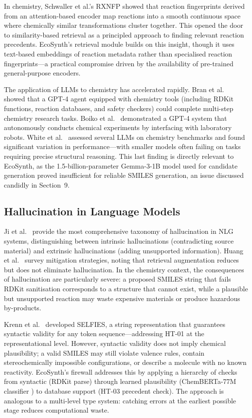 \documentclass[12pt,a4paper]{article}
\begin{document}
In chemistry, Schwaller et al.'s RXNFP \cite{schwaller2021rxnfp} showed that
reaction fingerprints derived from an attention-based encoder map reactions into
a smooth continuous space where chemically similar transformations cluster
together. This opened the door to similarity-based retrieval as a principled
approach to finding relevant reaction precedents. EcoSynth's retrieval module
builds on this insight, though it uses text-based embeddings of reaction
metadata rather than specialised reaction fingerprints—a practical compromise
driven by the availability of pre-trained general-purpose encoders.

The application of LLMs to chemistry has accelerated rapidly. Bran et
al.~\cite{bran2023chemcrow} showed that a GPT-4 agent equipped with chemistry
tools (including RDKit functions, reaction databases, and safety checkers) could
complete multi-step chemistry research tasks. Boiko et al.~\cite{boiko2023autonomous}
demonstrated a GPT-4 system that autonomously conducts chemical experiments by
interfacing with laboratory robots. White et al.~\cite{white2023chemllm}
assessed several LLMs on chemistry benchmarks and found significant variation
in performance—with smaller models often failing on tasks requiring precise
structural reasoning. This last finding is directly relevant to EcoSynth, as
the 1.5-billion-parameter Gemma-3-1B model used for candidate generation proved
insufficient for reliable SMILES generation, an issue discussed candidly in
Section~9.

\subsection{Hallucination in Language Models}

Ji et al.~\cite{ji2023hallucination} provide the most comprehensive taxonomy of
hallucination in NLG systems, distinguishing between intrinsic hallucinations
(contradicting source material) and extrinsic hallucinations (adding
unsupported information). Huang et al.~\cite{huang2023hallucination} survey
mitigation strategies, noting that retrieval augmentation reduces but does not
eliminate hallucination. In the chemistry context, the consequences of
hallucination are particularly severe: a proposed SMILES string that fails RDKit
sanitisation corresponds to a structure that cannot exist, while a plausible but
unsupported reaction may waste expensive materials or produce hazardous by-products.

Krenn et al.~\cite{krenn2020selfies} developed SELFIES, a string representation
that guarantees syntactic validity for any token sequence—addressing HT-01 at
the representational level. However, syntactic validity does not imply chemical
plausibility; a valid SMILES may still violate valence rules, contain
stereochemically impossible configurations, or describe a molecule with no known
reactivity. EcoSynth's firewall addresses this by applying a hierarchy of checks
from syntactic (RDKit parse) through learned plausibility (ChemBERTa-77M
classifier \cite{chithrananda2020chemberta}) to database support (HT-03 precedent
check). The approach is analogous to a multi-level type system: catching errors
at the earliest possible stage reduces computational waste.
\end{document}

